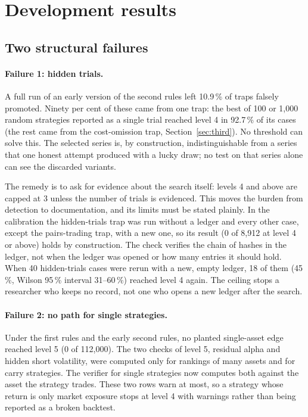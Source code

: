 \documentclass[11pt]{article}
\begin{document}
\section{Development results}\label{sec:results}

\subsection{Two structural failures}\label{sec:failures}

\paragraph{Failure 1: hidden trials.} A full run of an early version of the second rules left 10.9\,\% of traps falsely
promoted. Ninety per cent of these came from one trap: the best of 100 or 1,000 random strategies reported as a single
trial reached level 4 in 92.7\,\% of its cases (the rest came from the cost-omission trap,
Section~\ref{sec:third}). No threshold can solve this. The selected series is, by construction, indistinguishable from
a series that one honest attempt produced with a lucky draw; no test on that series alone can see the discarded
variants.

The remedy is to ask for evidence about the search itself: levels 4 and above are capped at 3 unless the number of
trials is evidenced. This moves the burden from detection to documentation, and its limits must be stated plainly. In
the calibration the hidden-trials trap was run without a ledger and every other case, except the pairs-trading trap,
with a new one, so its result (0 of 8,912 at level 4 or above) holds by construction. The check verifies the chain of
hashes in the ledger, not when the ledger was opened or how many entries it should hold. When 40 hidden-trials cases
were rerun with a new, empty ledger, 18 of them (45\,\%, Wilson 95\,\% interval 31--60\,\%) reached level 4 again. The
ceiling stops a researcher who keeps no record, not one who opens a new ledger after the search.

\paragraph{Failure 2: no path for single strategies.} Under the first rules and the early second rules, no planted
single-asset edge reached level 5 (0 of 112,000). The two checks of level 5, residual alpha and hidden short volatility,
were computed only for rankings of many assets and for carry strategies. The verifier for single strategies now computes
both against the asset the strategy trades. These two rows warn at most, so a strategy whose return is only market
exposure stops at level 4 with warnings rather than being reported as a broken backtest.
\end{document}
